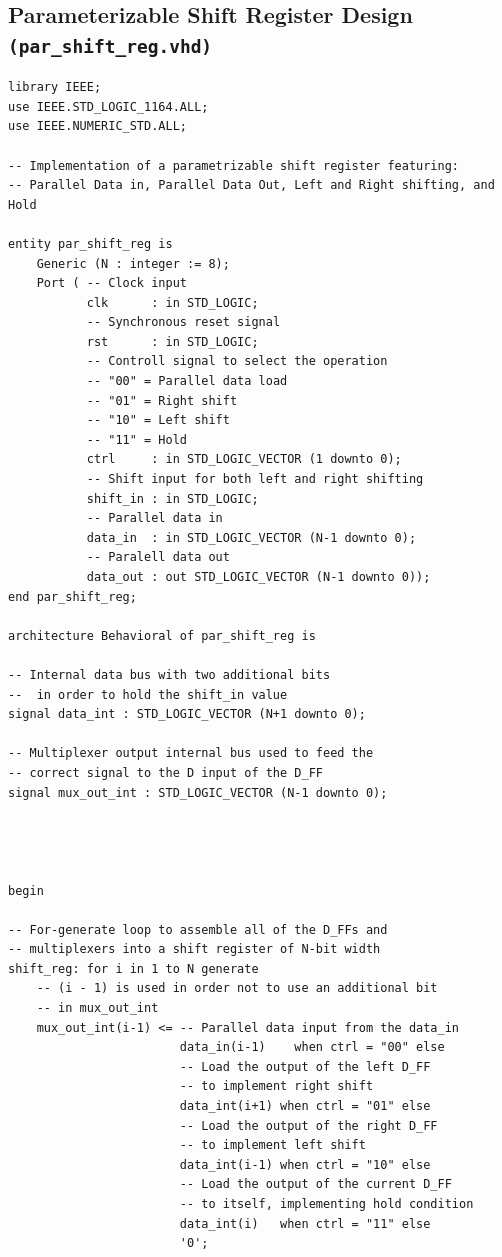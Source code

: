 \documentclass[10pt]{article}
\begin{document}
\subsection{Parameterizable Shift Register Design \texttt{(par\_shift\_reg.vhd)}}
\begin{verbatim}
library IEEE;
use IEEE.STD_LOGIC_1164.ALL;
use IEEE.NUMERIC_STD.ALL;

-- Implementation of a parametrizable shift register featuring:
-- Parallel Data in, Parallel Data Out, Left and Right shifting, and Hold

entity par_shift_reg is
    Generic (N : integer := 8);
    Port ( -- Clock input
           clk      : in STD_LOGIC;
           -- Synchronous reset signal
           rst      : in STD_LOGIC;
           -- Controll signal to select the operation
           -- "00" = Parallel data load
           -- "01" = Right shift
           -- "10" = Left shift
           -- "11" = Hold
           ctrl     : in STD_LOGIC_VECTOR (1 downto 0);
           -- Shift input for both left and right shifting
           shift_in : in STD_LOGIC;
           -- Parallel data in
           data_in  : in STD_LOGIC_VECTOR (N-1 downto 0);
           -- Paralell data out
           data_out : out STD_LOGIC_VECTOR (N-1 downto 0));
end par_shift_reg;

architecture Behavioral of par_shift_reg is

-- Internal data bus with two additional bits
--  in order to hold the shift_in value
signal data_int : STD_LOGIC_VECTOR (N+1 downto 0);

-- Multiplexer output internal bus used to feed the 
-- correct signal to the D input of the D_FF
signal mux_out_int : STD_LOGIC_VECTOR (N-1 downto 0);




begin

-- For-generate loop to assemble all of the D_FFs and 
-- multiplexers into a shift register of N-bit width
shift_reg: for i in 1 to N generate
    -- (i - 1) is used in order not to use an additional bit 
    -- in mux_out_int
    mux_out_int(i-1) <= -- Parallel data input from the data_in
                        data_in(i-1)    when ctrl = "00" else
                        -- Load the output of the left D_FF 
                        -- to implement right shift
                        data_int(i+1) when ctrl = "01" else
                        -- Load the output of the right D_FF
                        -- to implement left shift
                        data_int(i-1) when ctrl = "10" else
                        -- Load the output of the current D_FF
                        -- to itself, implementing hold condition
                        data_int(i)   when ctrl = "11" else
                        '0';
    

\end{verbatim}
\end{document}
